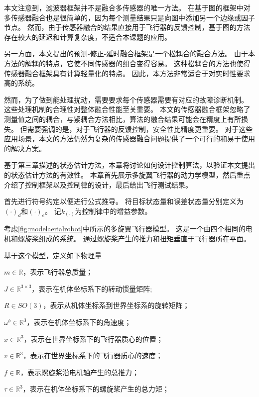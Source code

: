 \documentclass[
  type=master
]{gdutthesis}
\begin{document}
本文注意到，滤波器框架并不是融合多传感器的唯一方法。
在基于图的框架中对多传感器融合也是很简单的，因为每个测量结果只是向图中添加另一个边缘或因子节点\cite{schleicher2009real}。
然而，由于传感器融合的结果直接用于飞行器的反馈控制，基于图的方法存在较大的延迟和计算复杂度，不适合本课题的应用。

另一方面，本文提出的预测-修正-延时融合框架是一个松耦合的融合方法。
由于本方法的解耦的特点，它使不同传感器的组合变得容易。
这种松耦合的方法也使得传感器融合框架具有计算轻量化的特点。
因此，本方法非常适合于对实时性要求高的系统。

然而，为了做到能处理扰动，需要要求每个传感器需要有对应的故障诊断机制。
这些处理机制的合理性对整体融合性能至关重要。
本文的传感器融合框架忽略了测量值之间的耦合，与紧耦合方法相比，算法的融合结果可能会在精度上有所损失\cite{indelman2013incremental}。
但需要强调的是，对于飞行器的反馈控制，安全性比精度更重要。
对于这些应用场景，本文的方法仍然为复杂的传感器融合问题提供了一个可行的和易于使用的解决方案。

基于第三章描述的状态估计方法，本章将讨论如何设计控制算法，以验证本文提出的状态估计方法的有效性。
本章首先展示多旋翼飞行器的动力学模型，然后重点介绍了控制框架以及控制律的设计，最后给出飞行测试结果。

首先进行符号约定以便进行公式推导。
将目标状态量和误差状态量分别定义为$(\cdot)_d$和$(\cdot)_e$。
记$k_{(\cdot)}$为控制律中的增益参数。

考虑\autoref{fig:modelaerialrobot}中所示的多旋翼飞行器模型。
这是一个由四个相同的电机和螺旋桨组成的系统。
通过螺旋桨产生的推力和扭矩垂直于飞行器所在平面。

基于这个模型，定义如下物理量

$m \in \mathbb{R}$，表示飞行器总质量；

$J \in \mathbb{R}^{3 \times 3}$，表示在机体坐标系下的转动惯量矩阵;

$R \in SO(3)$，表示从机体坐标系到世界坐标系的旋转矩阵；

$\omega^b \in \mathbb{R}^3$，表示在机体坐标系下的角速度；

$x \in \mathbb{R}^3$，表示在世界坐标系下的飞行器质心的位置；

$v \in \mathbb{R}^3$，表示在世界坐标系下的飞行器质心的速度；

$f \in \mathbb{R}$，表示螺旋桨沿电机轴产生的总推力；

$\tau \in \mathbb{R}^3$，表示在机体坐标系下的螺旋桨产生的总力矩；
\end{document}
